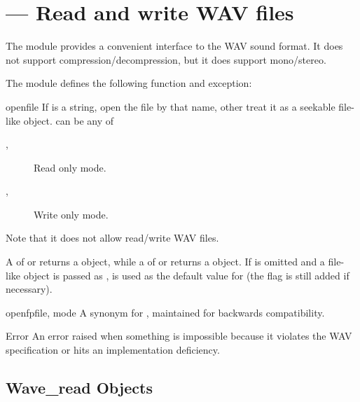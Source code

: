 \section{ ---
         Read and write WAV files}


The  module provides a convenient interface to the WAV sound
format. It does not support compression/decompression, but it does support
mono/stereo.

The  module defines the following function and exception:

\begin{funcdesc}{open}{file}
If  is a string, open the file by that name, other treat it
as a seekable file-like object.  can be any of
\begin{description}
        \item[, ] Read only mode.
        \item[, ] Write only mode.
\end{description}
Note that it does not allow read/write WAV files.

A  of  or  returns a 
object, while a  of  or  returns
a  object.  If  is omitted and a file-like 
object is passed as ,  is used as the
default value for  (the  flag is still added if 
necessary).
\end{funcdesc}

\begin{funcdesc}{openfp}{file, mode}
A synonym for , maintained for backwards compatibility.
\end{funcdesc}

\begin{excdesc}{Error}
An error raised when something is impossible because it violates the
WAV specification or hits an implementation deficiency.
\end{excdesc}


\subsection{Wave_read Objects \label{Wave-read-objects}}


